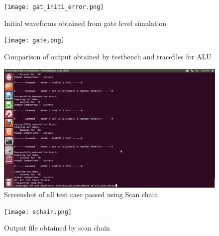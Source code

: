 \documentclass[12pt]{article}
\begin{document}
 \begin{figure}[H]
\begin{center}
\texttt{[image: gat\_initi\_error.png]}
\caption{Initial waveforms obtained from gate level simulation}
\end{center}
\end{figure}
 
  \begin{figure}[H]
\begin{center}
\texttt{[image: gate.png]}
\caption{Comparison of output obtained by testbench and tracefiles for ALU}
\end{center}
\end{figure}
 
 \begin{figure}[H]
\begin{center}
\includegraphics[width=20cm]{scp.png}
\caption{Screenshot of all test case passed using Scan chain}
\end{center}
\end{figure} 

 \begin{figure}[H]
\begin{center}
\texttt{[image: schain.png]}
\caption{Output file obtained by scan chain}
\end{center}
\end{figure} 
\end{document}
